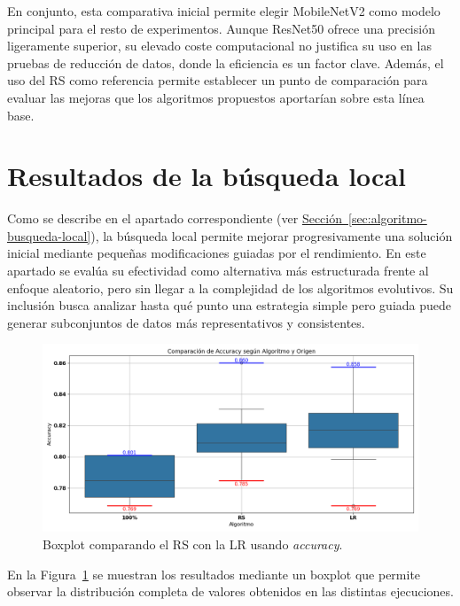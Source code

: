 En conjunto, esta comparativa inicial permite elegir MobileNetV2 como modelo principal para el resto de experimentos.
Aunque ResNet50 ofrece una precisión ligeramente superior, su elevado coste computacional no justifica su uso en las pruebas de reducción de datos,
donde la eficiencia es un factor clave.
Además, el uso del RS como referencia permite establecer un punto de comparación para evaluar las mejoras que los algoritmos propuestos aportarían sobre esta línea base.


\section{Resultados de la búsqueda local}\label{sec:resultados-busqueda-local}
Como se describe en el apartado correspondiente (ver \hyperref[sec:algoritmo-busqueda-local]{Sección~\ref*{sec:algoritmo-busqueda-local}}),
la búsqueda local permite mejorar progresivamente una solución inicial mediante pequeñas modificaciones guiadas por el rendimiento.
En este apartado se evalúa su efectividad como alternativa más estructurada frente al enfoque aleatorio, pero sin llegar a la complejidad de los algoritmos evolutivos.
Su inclusión busca analizar hasta qué punto una estrategia simple pero guiada puede generar subconjuntos de datos más representativos y consistentes.

\begin{figure}[htp]
    \centering
    \includegraphics[width=1\textwidth]{imagenes/evaluaciones/comparacion_aleatorio-lr}
    \caption{Boxplot comparando el RS con la LR usando \textit{accuracy}.}
    \label{fig:aleatorio-vs-busqueda-local}
\end{figure}
En la Figura~\ref{fig:aleatorio-vs-busqueda-local} se muestran los resultados mediante un boxplot que permite observar
la distribución completa de valores obtenidos en las distintas ejecuciones.

